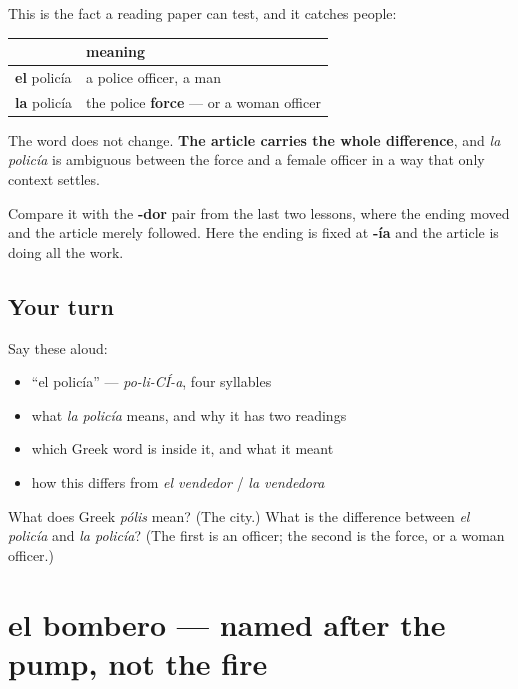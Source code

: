 \begin{grammarlens}[title={Grammar Lens: the article does the distinguishing}]
This is the fact a reading paper can test, and it catches people:

\noindent
\begin{tabularx}{\linewidth}{@{}>{\raggedright\arraybackslash}X>{\raggedright\arraybackslash}X@{}}
\toprule
\textbf{} & \textbf{meaning} \\
\midrule
\textbf{el} policía & a police officer, a man \\
\textbf{la} policía & the police \textbf{force} — or a woman officer \\
\bottomrule
\end{tabularx}

The word does not change. \textbf{The article carries the whole difference}, and \emph{la policía} is ambiguous between the force and a female officer in a way that only context settles.

Compare it with the \textbf{-dor} pair from the last two lessons, where the ending moved and the article merely followed. Here the ending is fixed at \textbf{-ía} and the article is doing all the work.
\end{grammarlens}

\subsection*{Your turn}
Say these aloud:

\begin{itemize}
\raggedright
  \item \textquotedblleft{}el policía\textquotedblright{} — \emph{po-li-CÍ-a}, four syllables
  \item what \emph{la policía} means, and why it has two readings
  \item which Greek word is inside it, and what it meant
  \item how this differs from \emph{el vendedor} / \emph{la vendedora}
\end{itemize}

\begin{tcolorbox}[breakable,colback=teal!4,colframe=teal!35!black,title={Before you move on}]
What does Greek \emph{pólis} mean? (The city.) What is the difference between \emph{el policía} and \emph{la policía}? (The first is an officer; the second is the force, or a woman officer.)
\end{tcolorbox}
\section[el bombero]{el bombero — named after the pump, not the fire}

